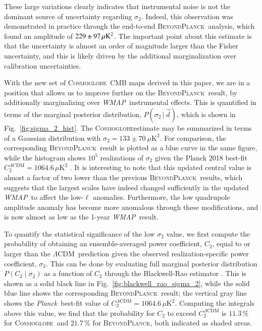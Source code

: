 \documentclass[twocolumn]{../../common/aa}
\def\WMAP{\emph{WMAP}}
\def\Planck{\emph{Planck}}
\def\LCDM{$\Lambda$CDM}
\newcommand{\bp}{\textsc{BeyondPlanck}}
\newcommand{\cosmoglobe}{\textsc{Cosmoglobe}}
\newcommand{\Cosmoglobe}{\textsc{Cosmoglobe}}
\newcommand{\data}{\vec d}
\begin{document}
These large variations clearly indicates that instrumental noise is not the dominant source of uncertainty regarding $\sigma_2$. Indeed, this observation was demonstrated in practice through the end-to-end \bp\ analysis, which found an amplitude of $229\pm97\muK^2$. The important point about this estimate is that the uncertainty is almost an order of magnitude larger than the Fisher uncertainty, and this is likely driven by the additional marginalization over calibration uncertainties. 



With the new set of \cosmoglobe\ CMB maps derived in this paper, we are in a position that allows us to improve further on the \bp\ result, by additionally marginalizing over \WMAP\ instrumental effects. This is quantified in terms of the marginal posterior distribution, $P(\sigma_2\,|\,\data)$, which is shown in Fig.~\ref{fig:sigma_2_hist}. The \cosmoglobe estimate may be summarized in terms of a Gaussian distribution with $\sigma_2 = 133 \pm 70\ \mu\mathrm{K}^2$. For comparison, the corresponding \bp\ result is plotted as a blue curve in the same figure, while the histogram shows $10^5$ realizations of $\sigma_2$ given the Planck 2018 best-fit $C^{\Lambda \mathrm{CDM}}_2 = 1064.6\, \mu\mathrm{K}^2$ \citep{planck2016-l06}. It is interesting to note that this updated central value is almost a factor of two lower than the previous \bp\ results, which suggests that the largest scales have indeed changed sufficiently in the updated \WMAP\ to affect the low-$\ell$ anomalies. Furthermore, the low quadrupole amplitude anomaly has become more anomalous through these modifications, and is now almost as low as the 1-year \WMAP\ result.




To quantify the statistical significance of the low $\sigma_2$ value, we first compute the probability of obtaining an ensemble-averaged power coefficient, $C_2$, equal to or larger than the \LCDM\ prediction given the observed realization-specific power coefficient, $\sigma_2$. This can be done by evaluating full marginal posterior distribution $P(C_2 \mid\sigma_2)$ as a function of $C_2$ through the Blackwell-Rao estimator \citep{chu2005}. This is shown as a solid black line in Fig.~\ref{fig:blackwell_rao_sigma_2}, while the solid blue line shows the corresponding \bp\ result; the vertical gray line shows the \Planck\ best-fit value of $C^{\Lambda \mathrm{CDM}}_2 = 1064.6\, \mu\mathrm{K}^2$. Computing the integrals above this value, we find that the probability for $C_2$ to exceed $C^{\Lambda \mathrm{CDM}}_2$ is $11.3\,\%$ for \cosmoglobe\ and $21.7\,\%$ for \bp, both indicated as shaded areas.
\end{document}
